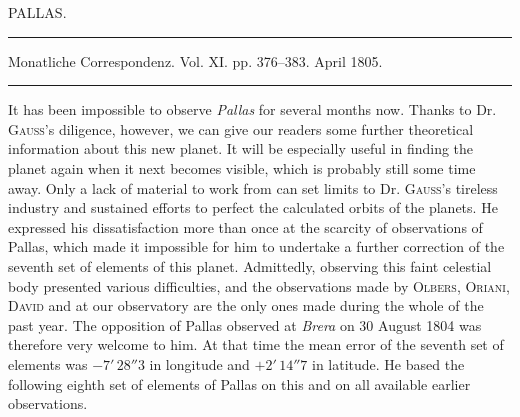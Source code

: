 \clearpage
{}
\hypertarget{native-267-lower}{}
\begin{center}
PALLAS.

\rule{0.5\linewidth}{0.4pt}

Monatliche Correspondenz. Vol. XI. pp. 376–383. April 1805.

\rule{0.5\linewidth}{0.4pt}
\end{center}

It has been impossible to observe \emph{Pallas} for several months now. Thanks to Dr. \textsc{Gauss}’s diligence, however, we can give our readers some further theoretical information about this new planet. It will be especially useful in finding the planet again when it next becomes visible, which is probably still some time away. Only a lack of material to work from can set limits to Dr. \textsc{Gauss}’s tireless industry and sustained efforts to perfect the calculated orbits of the planets. He expressed his dissatisfaction more than once at the scarcity of observations of Pallas, which made it impossible for him to undertake a further correction of the seventh set of elements of this planet. Admittedly, observing this faint celestial body presented various difficulties, and the observations made by \textsc{Olbers}, \textsc{Oriani}, \textsc{David} and at our observatory are the only ones made during the whole of the past year. The opposition of Pallas observed at \emph{Brera} on 30 August 1804 was therefore very welcome to him. At that time the mean error of the seventh set of elements was $-7'\,28''3$ in longitude and $+2'\,14''7$ in latitude. He based the following eighth set of elements of Pallas on this and on all available earlier observations.
